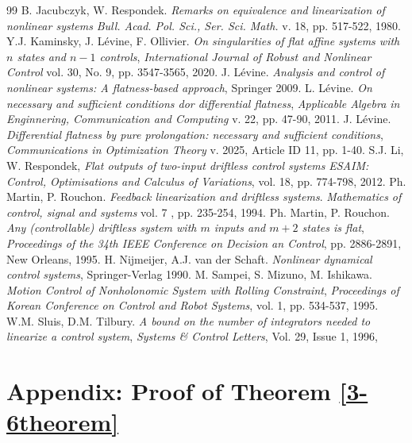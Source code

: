 \documentclass[10pt]{article}
\newcommand{\3}{\mathbf{3}}
\newcommand{\2}{\mathbf{2}}
\newcommand{\1}{\mathbf{1}}
\newcommand{\0}{\mathbf{0}}
\begin{document}
\begin{thebibliography}{99}
 B. Jacubczyk, W. Respondek. \emph{Remarks on equivalence and linearization of nonlinear systems} {\em Bull. Acad. Pol. Sci., Ser. Sci. Math.} v. 18, pp. 517-522, 1980.
 Y.J. Kaminsky, J. L\'evine, F. Ollivier. \emph{On singularities of flat affine systems with $n$ states and $n-1$ controls}, {\em International Journal of Robust and Nonlinear Control} vol. 30, No. 9, pp. 3547-3565, 2020.
 J. L\'{e}vine. \emph{Analysis and control of nonlinear systems: A flatness-based approach}, Springer 2009.
 L. L\'evine. \emph{On necessary and sufficient conditions dor differential flatness}, {\em Applicable Algebra in Enginnering, Communication and Computing} v. 22, pp. 47-90, 2011.
 J. L\'{e}vine. \emph{Differential flatness by pure prolongation: necessary and sufficient conditions}, {\em Communications in Optimization Theory} v. 2025, Article ID 11, pp. 1-40.
 S.J. Li, W. Respondek, \emph{Flat outputs of two-input driftless control systems} {\em ESAIM: Control, Optimisations and Calculus of Variations}, vol. 18, pp. 774-798, 2012.
 Ph. Martin, P. Rouchon. \emph{Feedback linearization and driftless systems}. {\em Mathematics of control, signal and systems} vol. 7 , pp. 235-254, 1994. %
 Ph. Martin, P. Rouchon. \emph{Any (controllable) driftless system with $m$ inputs and $m+2$ states is flat}, {\em Proceedings of the 34th IEEE Conference on Decision an Control}, pp. 2886-2891, New Orleans, 1995. %
 H. Nijmeijer, A.J. van der Schaft. \emph{Nonlinear dynamical control systems}, Springer-Verlag 1990.
 M. Sampei, S. Mizuno, M. Ishikawa.  \emph{Motion Control of Nonholonomic System with Rolling Constraint},  \emph{Proceedings of Korean Conference on Control and Robot Systems}, vol. 1, pp. 534-537, 1995.
 W.M. Sluis, D.M. Tilbury. \emph{A bound on the number of integrators needed to linearize a control system}, {\em Systems \& Control Letters}, Vol. 29, Issue 1, 1996,

\end{thebibliography}

\section{Appendix: Proof of Theorem \ref{3-6theorem}}
\end{document}
